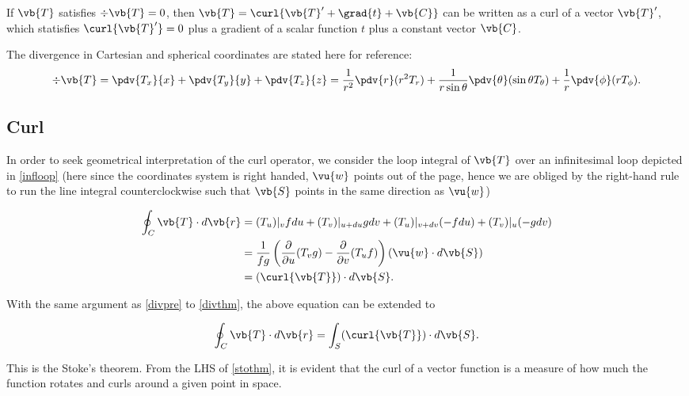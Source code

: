 \documentclass[english,a4paper,12pt]{report}
\begin{document}
If \(\vb{T} \) satisfies \(\div{\vb{T} } = 0 \), then \(\vb{T} = \curl{\vb{T} ' + \grad{t} + \vb{C} } \) can be written as a curl of a vector \(\vb{T} '\), which statisfies \(\curl{\vb{T} '} = 0 \) plus a gradient of a scalar function \(t\) plus a constant vector \(\vb{C} \).        

The divergence in Cartesian and spherical coordinates are stated here for reference:
\begin{equation} 
	\div{\vb{T}} = \pdv{T_x}{x} + \pdv{T_y}{y} + \pdv{T_z}{z} = \frac{1}{r^2}\pdv{r}(r^2T_r) + \frac{1}{r\sin{\theta}}\pdv{\theta}(\sin{\theta}T_{\theta}) + \frac{1}{r}\pdv{\phi}(rT_{\phi}). 
\end{equation}
	
\subsection{Curl}

In order to seek geometrical interpretation of the curl operator, we consider the loop integral of \(\vb{T}\) over an infinitesimal loop depicted in \cref{infloop} (here since the coordinates system is right handed, \(\vu{w}\) points out of the page, hence we are obliged by the right-hand rule to run the line integral counterclockwise such that \(\vb{S}\) points in the same direction as \(\vu{w}\))
	
\begin{equation} 
	\begin{aligned} 
		\oint_{C} \vb{T} \cdot d\vb{r} &= (T_u)|_{v}fdu + (T_v)|_{u+du}gdv + (T_u)|_{v+dv}(-fdu) + (T_v)|_{u}(-gdv) \\ &= \frac{1}{fg}\left(\frac{\partial }{\partial u} (T_{v} g) - \frac{\partial }{\partial v} (T_{u}f)\right)(\vu{w} \cdot d\vb{S}) \\ &= (\curl{\vb{T} } ) \cdot d\vb{S} . 
	\end{aligned} 
\end{equation}

With the same argument as \cref{divpre}  to \cref{divthm}, the above equation can be extended to
	
\begin{equation} 
	\oint_{C} \vb{T} \cdot d\vb{r} = \int_{S} (\curl{\vb{T}}) \cdot d\vb{S}. \label{stothm} 
\end{equation}
	
This is the Stoke's theorem. From the LHS of \cref{stothm}, it is evident that the curl of a vector function is a measure of how much the function rotates and curls around a given point in space.
\end{document}
